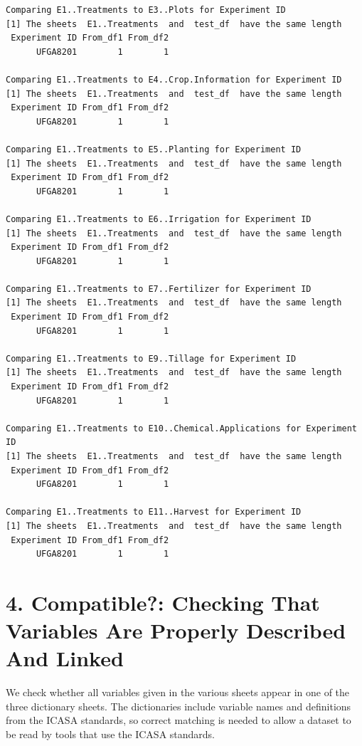 \documentclass[
]{article}
\begin{document}
\begin{verbatim}
Comparing E1..Treatments to E3..Plots for Experiment ID 
[1] The sheets  E1..Treatments  and  test_df  have the same length
 Experiment ID From_df1 From_df2
      UFGA8201        1        1

Comparing E1..Treatments to E4..Crop.Information for Experiment ID 
[1] The sheets  E1..Treatments  and  test_df  have the same length
 Experiment ID From_df1 From_df2
      UFGA8201        1        1

Comparing E1..Treatments to E5..Planting for Experiment ID 
[1] The sheets  E1..Treatments  and  test_df  have the same length
 Experiment ID From_df1 From_df2
      UFGA8201        1        1

Comparing E1..Treatments to E6..Irrigation for Experiment ID 
[1] The sheets  E1..Treatments  and  test_df  have the same length
 Experiment ID From_df1 From_df2
      UFGA8201        1        1

Comparing E1..Treatments to E7..Fertilizer for Experiment ID 
[1] The sheets  E1..Treatments  and  test_df  have the same length
 Experiment ID From_df1 From_df2
      UFGA8201        1        1

Comparing E1..Treatments to E9..Tillage for Experiment ID 
[1] The sheets  E1..Treatments  and  test_df  have the same length
 Experiment ID From_df1 From_df2
      UFGA8201        1        1

Comparing E1..Treatments to E10..Chemical.Applications for Experiment ID 
[1] The sheets  E1..Treatments  and  test_df  have the same length
 Experiment ID From_df1 From_df2
      UFGA8201        1        1

Comparing E1..Treatments to E11..Harvest for Experiment ID 
[1] The sheets  E1..Treatments  and  test_df  have the same length
 Experiment ID From_df1 From_df2
      UFGA8201        1        1
\end{verbatim}

\newpage

\section{4. Compatible?: Checking That Variables Are Properly Described
And
Linked}\label{compatible-checking-that-variables-are-properly-described-and-linked}

We check whether all variables given in the various sheets appear in one
of the three dictionary sheets. The dictionaries include variable names
and definitions from the ICASA standards, so correct matching is needed
to allow a dataset to be read by tools that use the ICASA standards.
\end{document}
